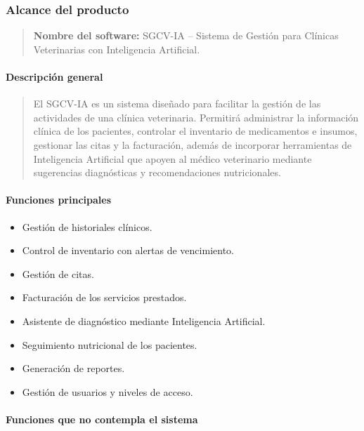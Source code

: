 \documentclass[
]{article}
\begin{document}
\subsubsection{Alcance del producto}\label{alcance-del-producto}

\begin{quote}
\textbf{Nombre del software:} SGCV-IA -- Sistema de Gestión para
Clínicas Veterinarias con Inteligencia Artificial.
\end{quote}

\paragraph{Descripción general}\label{descripciuxf3n-general}

\begin{quote}
El SGCV-IA es un sistema diseñado para facilitar la gestión de las
actividades de una clínica veterinaria. Permitirá administrar la
información clínica de los pacientes, controlar el inventario de
medicamentos e insumos, gestionar las citas y la facturación, además de
incorporar herramientas de Inteligencia Artificial que apoyen al médico
veterinario mediante sugerencias diagnósticas y recomendaciones
nutricionales.
\end{quote}

\paragraph{Funciones principales}\label{funciones-principales}

\begin{itemize}
\item
  Gestión de historiales clínicos.
\item
  Control de inventario con alertas de vencimiento.
\item
  Gestión de citas.
\item
  Facturación de los servicios prestados.
\item
  Asistente de diagnóstico mediante Inteligencia Artificial.
\item
  Seguimiento nutricional de los pacientes.
\item
  Generación de reportes.
\item
  Gestión de usuarios y niveles de acceso.
\end{itemize}

\paragraph{Funciones que no contempla el
sistema}\label{funciones-que-no-contempla-el-sistema}
\end{document}
